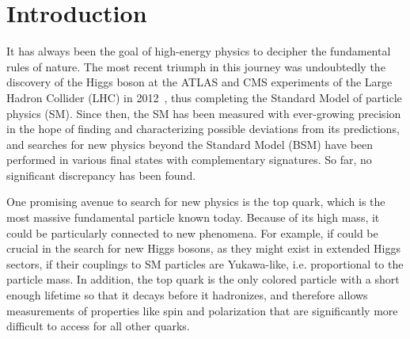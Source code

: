 \chapter{Introduction}
\label{ch:intro}


It has always been the goal of high-energy physics to decipher the fundamental rules of nature. The most recent triumph in this journey was undoubtedly the discovery of the Higgs boson at the ATLAS and CMS experiments of the Large Hadron Collider (LHC) in 2012~\cite{ATLAS:2012tfa,CMS:HIG-12-028,CMS:HIG-12-036}, thus completing the Standard Model of particle physics (SM). Since then, the SM has been measured with ever-growing precision in the hope of finding and characterizing possible deviations from its predictions, and searches for new physics beyond the Standard Model (BSM) have been performed in various final states with complementary signatures. So far, no significant discrepancy has been found.

One promising avenue to search for new physics is the top quark, which is the most massive fundamental particle known today.
Because of its high mass, it could be particularly connected to new phenomena.
For example, if could be crucial in the search for new Higgs bosons, as they might exist in extended Higgs sectors, if their couplings to SM particles are Yukawa-like, i.e. proportional to the particle mass.
In addition, the top quark is the only colored particle with a short enough lifetime so that it decays before it hadronizes, and therefore allows measurements of properties like spin and polarization that are significantly more difficult to access for all other quarks. 

\medskip

